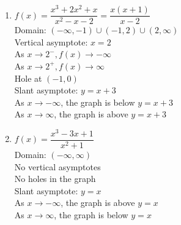 \begin{multicols}{2}
\begin{enumerate}
\setcounter{enumi}{\value{HW}}


\item $f(x) = \dfrac{x^3+2x^2+x}{x^{2} -x-2} = \dfrac{x(x+1)}{x - 2}$\\
Domain: $(-\infty, -1) \cup (-1, 2) \cup (2, \infty)$\\
Vertical asymptote: $x = 2$\\
As $x \rightarrow 2^{-}, f(x) \rightarrow -\infty$\\
As $x \rightarrow 2^{+}, f(x) \rightarrow \infty$\\
Hole at $(-1,0)$ \\
Slant asymptote: $y=x+3$ \\
As $x \rightarrow -\infty$, the graph is below $y=x+3$\\
As $x \rightarrow \infty$, the graph is above $y=x+3$\\

\vfill

\columnbreak

\item $f(x) = \dfrac{x^3-3x+1}{x^2+1}$\\
Domain: $(-\infty, \infty)$\\
No vertical asymptotes \\
No holes in the graph \\
Slant asymptote: $y=x$ \\
As $x \rightarrow -\infty$, the graph is above $y=x$ \\
As $x \rightarrow \infty$, the graph is below $y=x$  \\


\setcounter{HW}{\value{enumi}}
\end{enumerate}
\end{multicols}

\newpage

